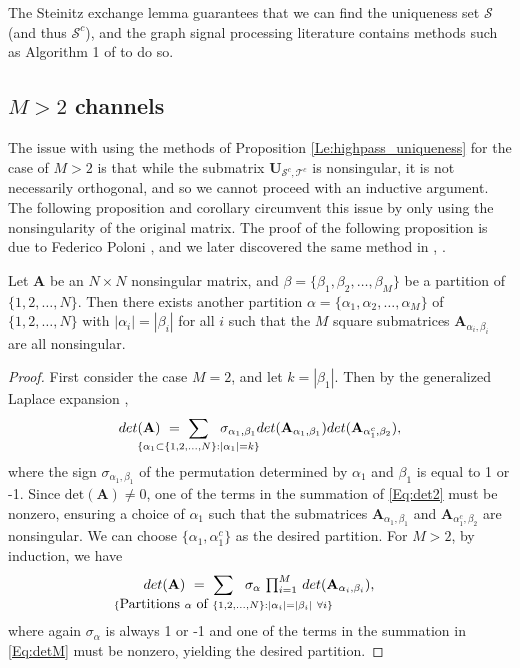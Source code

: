 \documentclass[journal, 10pt]{IEEEtran}
\begin{document}
The Steinitz exchange lemma \cite{steinitz} guarantees that we can find the uniqueness set $\mathcal{S}$ (and thus $\mathcal{S}^c$), and the graph signal processing literature contains methods such as Algorithm 1 of \cite{shomorony} to do so.

\subsection{$M>2$ channels}
The issue with using the methods of Proposition \ref{Le:highpass_uniqueness} for the case of $M>2$ is that while the submatrix ${\mathbf{U}}_{{\mathcal S^c},{\mathcal T^c}}$ is nonsingular, it is not necessarily orthogonal, and so we cannot proceed with an inductive argument. The following proposition and corollary circumvent this issue by only using the nonsingularity of the original matrix. The proof of the following proposition is due to Federico Poloni \cite{poloni}, %
and we later discovered the same method in \cite{greeneMultiple}, \cite[Theorem 3.3]{greene_magnanti}.
\begin{proposition}\label{Pr:mat_part}
Let $\mathbf{A}$ be an $N \times N$ nonsingular matrix, and $\beta=\{\beta_1,\beta_2,\ldots,\beta_M\}$ be a partition of $\{1,2,\ldots,N\}$. Then there exists another partition $\alpha=\{\alpha_1,\alpha_2,\ldots,\alpha_M\}$ of $\{1,2,\ldots,N\}$ with $|\alpha_i|=|\beta_i|$ for all $i$ such that the $M$ square submatrices $\mathbf{A}_{\alpha_i,\beta_i}$ are all nonsingular.
\end{proposition}
\begin{proof}%
First consider the case $M=2$, and let $k=|\beta_1|$. Then by the generalized Laplace expansion \cite{gle}, 
\begin{align}\label{Eq:det2}
\mbox{det}(\mathbf{A})~=~\sum_{\mathclap{\{\alpha_1 \subset \{1,2,\ldots,N\}: |\alpha_1|=k \}}}~~\sigma_{\alpha_1,\beta_1} \mbox{det}(\mathbf{A}_{\alpha_1,\beta_1})\mbox{det}(\mathbf{A}_{\alpha_1^c,\beta_2}),
\end{align}
where the sign $\sigma_{\alpha_1,\beta_1}$ of the permutation determined by $\alpha_1$ and $\beta_1$ is equal to 1 or -1. Since $\mbox{det}(\mathbf{A})\neq 0$, one of the terms in the summation of \eqref{Eq:det2} must be nonzero, ensuring a choice of $\alpha_1$ such that the submatrices $\mathbf{A}_{\alpha_1,\beta_1}$ and $\mathbf{A}_{\alpha_1^c,\beta_2}$ are nonsingular. We can choose $\{\alpha_1,\alpha_1^c\}$ as the desired partition. For $M>2$, by induction, we have
\begin{align}\label{Eq:detM}
\mbox{det}(\mathbf{A})~=~\sum_{\mathclap{\{\hbox{Partitions } \alpha \hbox{ of }\{1,2,\ldots,N\}: |\alpha_i|=|\beta_i|~\forall i \}}}~~\sigma_{\alpha}~{\textstyle \prod_{i=1}^M}~\mbox{det}(\mathbf{A}_{\alpha_i,\beta_i}),
\end{align}
where again $\sigma_\alpha$ is always 1 or -1 and one of the terms in the summation in \eqref{Eq:detM} must be nonzero, yielding the desired partition. 
\end{proof}
\end{document}
